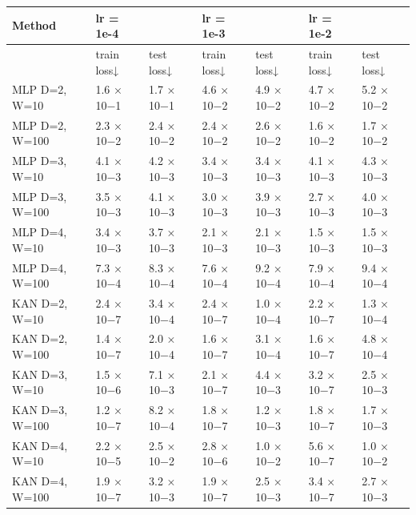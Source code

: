 \begin{tabular}{lllllll}
\toprule
Method & lr = 1e-4 &  & lr = 1e-3 &  & lr = 1e-2 &  \\
\midrule
 & train loss↓ & test loss↓ & train loss↓ & test loss↓ & train loss↓ & test loss↓ \\
MLP D=2, W=10 & 1.6 × 10−1 & 1.7 × 10−1 & 4.6 × 10−2 & 4.9 × 10−2 & 4.7 × 10−2 & 5.2 × 10−2 \\
MLP D=2, W=100 & 2.3 × 10−2 & 2.4 × 10−2 & 2.4 × 10−2 & 2.6 × 10−2 & 1.6 × 10−2 & 1.7 × 10−2 \\
MLP D=3, W=10 & 4.1 × 10−3 & 4.2 × 10−3 & 3.4 × 10−3 & 3.4 × 10−3 & 4.1 × 10−3 & 4.3 × 10−3 \\
MLP D=3, W=100 & 3.5 × 10−3 & 4.1 × 10−3 & 3.0 × 10−3 & 3.9 × 10−3 & 2.7 × 10−3 & 4.0 × 10−3 \\
MLP D=4, W=10 & 3.4 × 10−3 & 3.7 × 10−3 & 2.1 × 10−3 & 2.1 × 10−3 & 1.5 × 10−3 & 1.5 × 10−3 \\
MLP D=4, W=100 & 7.3 × 10−4 & 8.3 × 10−4 & 7.6 × 10−4 & 9.2 × 10−4 & 7.9 × 10−4 & 9.4 × 10−4 \\
KAN D=2, W=10 & 2.4 × 10−7 & 3.4 × 10−4 & 2.4 × 10−7 & 1.0 × 10−4 & 2.2 × 10−7 & 1.3 × 10−4 \\
KAN D=2, W=100 & 1.4 × 10−7 & 2.0 × 10−4 & 1.6 × 10−7 & 3.1 × 10−4 & 1.6 × 10−7 & 4.8 × 10−4 \\
KAN D=3, W=10 & 1.5 × 10−6 & 7.1 × 10−3 & 2.1 × 10−7 & 4.4 × 10−3 & 3.2 × 10−7 & 2.5 × 10−3 \\
KAN D=3, W=100 & 1.2 × 10−7 & 8.2 × 10−4 & 1.8 × 10−7 & 1.2 × 10−3 & 1.8 × 10−7 & 1.7 × 10−3 \\
KAN D=4, W=10 & 2.2 × 10−5 & 2.5 × 10−2 & 2.8 × 10−6 & 1.0 × 10−2 & 5.6 × 10−7 & 1.0 × 10−2 \\
KAN D=4, W=100 & 1.9 × 10−7 & 3.2 × 10−3 & 1.9 × 10−7 & 2.5 × 10−3 & 3.4 × 10−7 & 2.7 × 10−3 \\
\bottomrule
\end{tabular}
